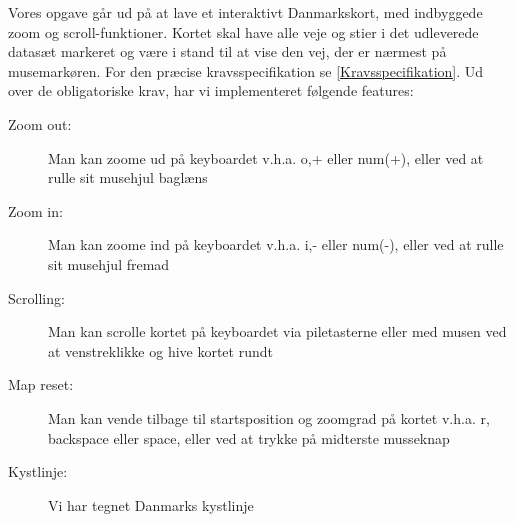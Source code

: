Vores opgave går ud på at lave et interaktivt Danmarkskort, med indbyggede zoom og scroll-funktioner. Kortet skal have alle veje og stier i det udleverede datasæt markeret og være i stand til at vise den vej, der er nærmest på musemarkøren. For den præcise kravsspecifikation se \ref{Kravsspecifikation}.
\newline \newline
Ud over de obligatoriske krav, har vi implementeret følgende features:
\begin{description}
	\item[Zoom out:] Man kan zoome ud på keyboardet v.h.a. o,+ eller num(+), eller ved at rulle sit musehjul baglæns
	\item[Zoom in:] Man kan zoome ind på keyboardet v.h.a. i,- eller num(-), eller ved at rulle sit musehjul fremad
	\item[Scrolling:] Man kan scrolle kortet på keyboardet via piletasterne eller med musen ved at venstreklikke og hive kortet rundt
	\item[Map reset:] Man kan vende tilbage til startsposition og zoomgrad på kortet v.h.a. r, backspace eller space, eller ved at trykke på midterste musseknap
	\item[Kystlinje:] Vi har tegnet Danmarks kystlinje
\end{description}